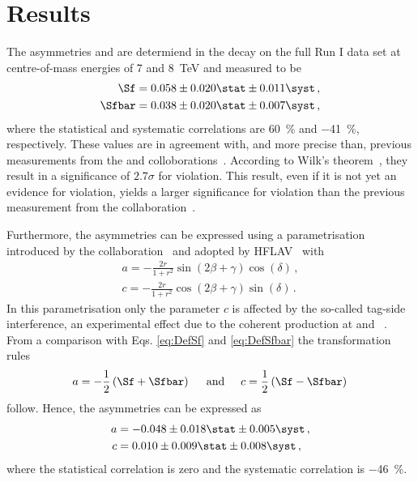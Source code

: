 \chapter{Results}
\label{chap:results}

\linespread{1.08}\selectfont
The \CP asymmetries \Sf and \Sfbar are determiend in the \BdToDpi decay on the full \lhcb Run I data set at centre-of-mass energies of \num{7} and \SI{8}{\tera\electronvolt} and measured to be
\begin{equation}
\begin{aligned}
\Sf&=0.058\pm0.020\stat\pm0.011\syst\,,\\
\Sfbar&=0.038\pm0.020\stat\pm0.007\syst\,,
\end{aligned}
\end{equation}
where the statistical and systematic correlations are \SI{60}{\percent} and \SI{-41}{\percent}, respectively.
These values are in agreement with, and more precise than, previous measurements from the \belle and \babar colloborations~\cite{Ronga:2006hv,Aubert:2006tw}.
According to Wilk's theorem~\cite{wilks1938}, they result in a significance of $2.7\sigma$ for \mbox{\CP violation}.
This result, even if it is not yet an evidence for \CP violation, yields a larger significance for \CP violation than the previous measurement from the \belle collaboration~\cite{Ronga:2006hv}.

Furthermore, the \CP asymmetries can be expressed using a parametrisation introduced by the \babar collaboration~\cite{Aubert:2006tw} and adopted by HFLAV~\cite{HFLAV2016} with
\begin{equation}
\begin{aligned}
a=-\frac{2r}{1+r^2}\sin\!\left(2\beta+\gamma\right)\cos\!\left(\delta\right)\,,\\
c=-\frac{2r}{1+r^2}\cos\!\left(2\beta+\gamma\right)\sin\!\left(\delta\right)\,.
\end{aligned}
\end{equation}
In this parametrisation only the parameter $c$ is affected by the so-called tag-side interference, an experimental effect due to the coherent \Bz\Bzb production at \belle and \babar~\cite{Long:2003wq}.
From a comparison with Eqs. \eqref{eq:DefSf} and \eqref{eq:DefSfbar} the transformation rules
\begin{equation}
a=-\frac{1}{2}\left(\Sf+\Sfbar\right)\hspace{0.5cm}\text{and}\hspace{0.5cm}c=\frac{1}{2}\left(\Sf-\Sfbar\right)\\
\end{equation}
follow.
Hence, the \CP asymmetries can be expressed as
\begin{equation}
\begin{aligned}
a&=-0.048\pm0.018\stat\pm0.005\syst\,,\\
c&=0.010\pm0.009\stat\pm0.008\syst\,,\\
\end{aligned}
\end{equation}
where the statistical correlation is zero and the systematic correlation is \SI{-46}{\percent}.

